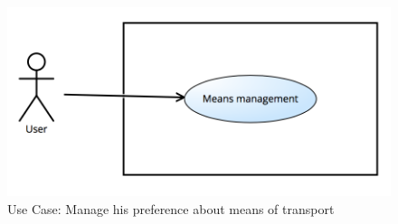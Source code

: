 \documentclass[numbers=noenddot, 12pt, a4paper, oneside]{scrbook}
\begin{document}
\begin{figure}[H]
	\includegraphics[width=1\textwidth]{usecases/Scenario3}
	\caption{Use Case: Manage his preference about means of transport}
\end{figure}
\end{document}
